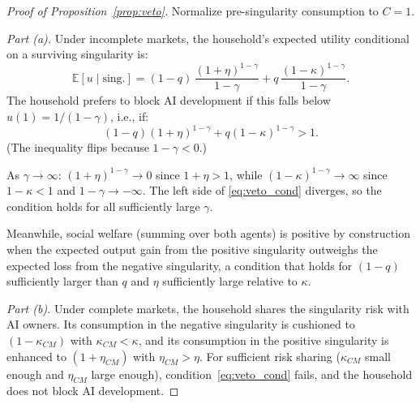 \documentclass[12pt]{article}
\begin{document}
\begin{proof}[Proof of Proposition~\ref{prop:veto}]
Normalize pre-singularity consumption to $C = 1$.

\emph{Part (a).} Under incomplete markets, the household's expected utility conditional on a surviving singularity is:
\begin{equation}
  \mathbb{E}[u \mid \text{sing.}] = (1-q)\,\frac{(1+\eta)^{1-\gamma}}{1-\gamma} + q\,\frac{(1-\kappa)^{1-\gamma}}{1-\gamma}. \label{eq:veto_eu} %
\end{equation}
The household prefers to block AI development if this falls below $u(1) = 1/(1-\gamma)$, i.e., if:
\begin{equation}
  (1-q)(1+\eta)^{1-\gamma} + q(1-\kappa)^{1-\gamma} > 1. \label{eq:veto_cond} %
\end{equation}
(The inequality flips because $1-\gamma < 0$.)

As $\gamma \to \infty$: $(1+\eta)^{1-\gamma} \to 0$ since $1+\eta > 1$, while $(1-\kappa)^{1-\gamma} \to \infty$ since $1-\kappa < 1$ and $1-\gamma \to -\infty$. The left side of \eqref{eq:veto_cond} diverges, so the condition holds for all sufficiently large $\gamma$.

Meanwhile, social welfare (summing over both agents) is positive by construction when the expected output gain from the positive singularity outweighs the expected loss from the negative singularity, a condition that holds for $(1-q)$ sufficiently larger than $q$ and $\eta$ sufficiently large relative to $\kappa$.

\emph{Part (b).} Under complete markets, the household shares the singularity risk with AI owners. Its consumption in the negative singularity is cushioned to $(1-\kappa_{CM})$ with $\kappa_{CM} < \kappa$, and its consumption in the positive singularity is enhanced to $(1+\eta_{CM})$ with $\eta_{CM} > \eta$. For sufficient risk sharing ($\kappa_{CM}$ small enough and $\eta_{CM}$ large enough), condition~\eqref{eq:veto_cond} fails, and the household does not block AI development.
\end{proof}


\printbibliography
\end{document}
